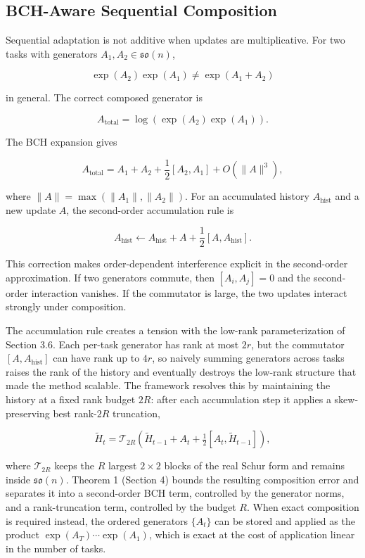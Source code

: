 \documentclass[
]{article}
\begin{document}
\subsection{BCH-Aware Sequential Composition}\label{bch-aware-sequential-composition}

Sequential adaptation is not additive when updates are multiplicative. For two tasks with generators \(A_1,A_2\in\mathfrak{so}(n)\),

\[
\exp(A_2)\exp(A_1)\neq \exp(A_1+A_2)
\]

in general. The correct composed generator is

\[
A_{\mathrm{total}}
=\log(\exp(A_2)\exp(A_1)).
\]

The BCH expansion gives

\[
A_{\mathrm{total}}
=A_1+A_2+\frac{1}{2}[A_2,A_1]+O(\|A\|^3),
\]

where \(\|A\|=\max(\|A_1\|,\|A_2\|)\). For an accumulated history \(A_{\mathrm{hist}}\) and a new update \(A\), the second-order accumulation rule is

\[
A_{\mathrm{hist}}\leftarrow
A_{\mathrm{hist}}+A+\frac{1}{2}[A,A_{\mathrm{hist}}].
\]

This correction makes order-dependent interference explicit in the second-order approximation. If two generators commute, then \([A_i,A_j]=0\) and the second-order interaction vanishes. If the commutator is large, the two updates interact strongly under composition.

The accumulation rule creates a tension with the low-rank parameterization of Section 3.6. Each per-task generator has rank at most \(2r\), but the commutator \([A,A_{\mathrm{hist}}]\) can have rank up to \(4r\), so naively summing generators across tasks raises the rank of the history and eventually destroys the low-rank structure that made the method scalable. The framework resolves this by maintaining the history at a fixed rank budget \(2R\): after each accumulation step it applies a skew-preserving best rank-\(2R\) truncation,

\[
\tilde{H}_t=\mathcal{T}_{2R}\!\left(\tilde{H}_{t-1}+A_t+\tfrac{1}{2}[A_t,\tilde{H}_{t-1}]\right),
\]

where \(\mathcal{T}_{2R}\) keeps the \(R\) largest \(2\times 2\) blocks of the real Schur form and remains inside \(\mathfrak{so}(n)\). Theorem 1 (Section 4) bounds the resulting composition error and separates it into a second-order BCH term, controlled by the generator norms, and a rank-truncation term, controlled by the budget \(R\). When exact composition is required instead, the ordered generators \(\{A_t\}\) can be stored and applied as the product \(\exp(A_T)\cdots\exp(A_1)\), which is exact at the cost of application linear in the number of tasks.
\end{document}
